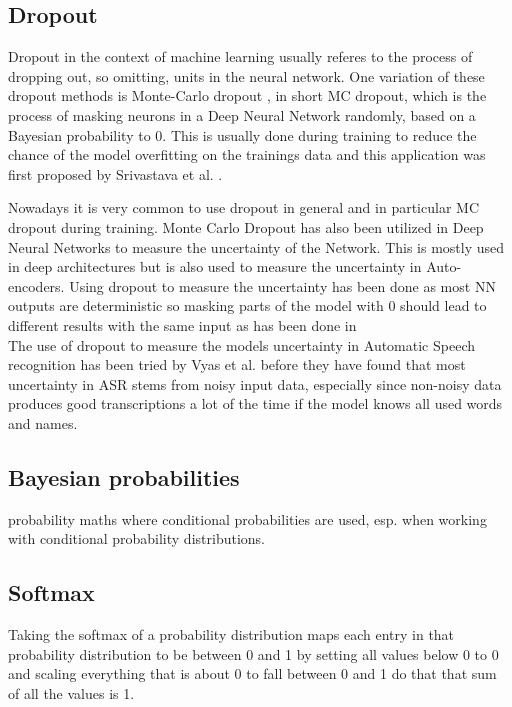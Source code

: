 

\subsection{Dropout}
Dropout in the context of machine learning usually referes to the process of dropping out, so omitting, units in the neural network. 
One variation of these dropout methods is Monte-Carlo dropout \cite{gal2016dropoutbayesianapproximationrepresenting}, in short MC dropout, which is the process of masking neurons in a Deep Neural Network randomly, based on a Bayesian probability to 0. 
This is usually done during training to reduce the chance of the model overfitting on the trainings data and this application was first proposed by Srivastava et al. \cite{JMLR:v15:srivastava14a}. 

Nowadays it is very common to use dropout in general and in particular MC dropout during training.
Monte Carlo Dropout has also been utilized in Deep Neural Networks to measure the uncertainty of the Network.   
This is mostly used in deep architectures but is also used to measure the uncertainty in Auto-encoders. \cite{gawlikowski2022surveyuncertaintydeepneural}
Using dropout to measure the uncertainty has been done as most NN outputs are deterministic so masking parts of the model with 0 should lead to different results with the same input as has been done in \cite{gal2016dropoutbayesianapproximationrepresenting}\\
The use of dropout to measure the models uncertainty in Automatic Speech recognition has been tried by Vyas et al. \cite{8683086} before 
they have found that most uncertainty in ASR stems from noisy input data, especially since non-noisy data produces good transcriptions a lot of the time if the model knows all used words and names. 

\subsection{Bayesian probabilities}
probability maths where conditional probabilities are used, esp. when working with conditional probability distributions.

\subsection{Softmax}
Taking the softmax of a probability distribution maps each entry in that probability distribution to be between 0 and 1 by setting all values below 0 to 0 and scaling everything that is about 0 to fall between 0 and 1 do that that sum of all the values is 1. 

